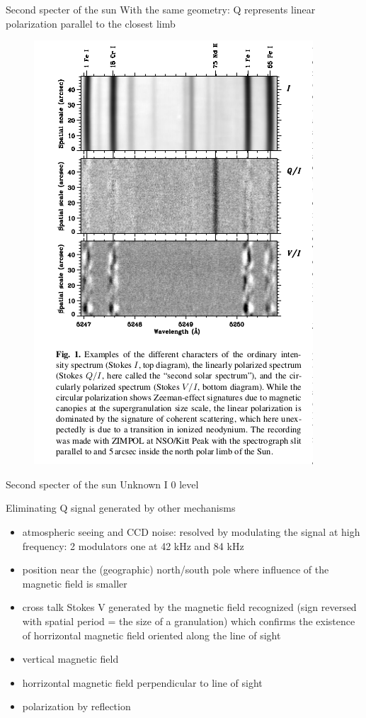 \documentclass{beamer}
\begin{document}
\begin{frame}{Second specter of the sun}
With the same geometry: Q represents linear polarization parallel to the closest limb
\begin{figure}[H]
 \centering
 \includegraphics[scale=0.5]{a3.png}
\end{figure}
\end{frame}

\begin{frame}{Second specter of the sun}
Unknown I 0 level

Eliminating Q signal generated by other mechanisms

\begin{itemize}

\item atmospheric seeing and CCD noise: resolved by modulating the signal at high frequency: 2 modulators one
at 42 kHz and 84 kHz

\item position near the (geographic) north/south pole where influence of the magnetic field is smaller

\item cross talk Stokes V generated by the magnetic field recognized (sign reversed with spatial period = the size of a granulation)
which confirms the existence of horrizontal  magnetic field oriented along the line of sight 

\item vertical magnetic field 

\item horrizontal magnetic field perpendicular to line of sight

\item polarization by reflection
\end{itemize}
\end{frame}
\end{document}
